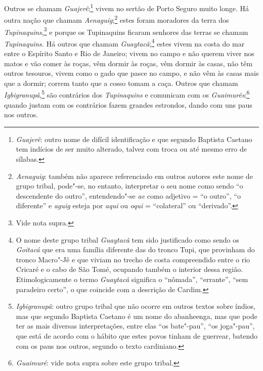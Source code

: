  Outros se chamam \textit{Guajerê};\footnote{ \textit{Guajerê}: outro
nome de difícil identificação e que segundo Baptista Caetano tem
indícios de ser muito alterado, talvez com troca ou até mesmo erro de
sílabas.} vivem no sertão de Porto Seguro muito longe. Há
outra nação que chamam \textit{Aenaguig};\footnote{ \textit{Aenaguig}: 
também não aparece referenciado em outros autores este nome de grupo
tribal, pode"-se, no entanto, interpretar o seu nome como sendo ``o
descendente do outro'', entendendo"-se \textit{ae} como adjetivo = ``o
outro'', ``o diferente'' e \textit{aguig} esteja por \textit{aqui} ou
\textit{oqui} = ``colateral'' ou ``derivado''.} estes foram
moradores da terra dos \textit{Tupinaquins},\footnote{ Vide nota
supra.} e porque os Tupinaquins ficaram senhores das terras se
chamam \textit{Tupinaquins.} Há outros que chamam 
\textit{Guaytacâ};\footnote{ O nome deste grupo tribal \textit{Guaytacâ} tem sido
justificado como sendo os \textit{Goitacá} que era uma família
diferente das do tronco Tupi, que provinham do tronco Macro"-Jê e que
viviam no trecho de costa compreendido entre o rio Cricaré e o cabo de
São Tomé, ocupando também o interior dessa região. Etimologicamente o
termo \textit{Guaytacâ} significa o ``nômada'', ``errante'', ``sem paradeiro
certo'', o que coincide com a descrição de Cardim.} estes vivem
na costa do mar entre o Espírito Santo e Rio de Janeiro; vivem no campo
e não querem viver nos matos e vão comer às roças, vêm dormir às roças,
vêm dormir às casas, não têm outros tesouros, vivem como o gado que
pasce no campo, e não vêm às casas mais que a dormir; correm tanto que
a cosso tomam a caça. Outros que chamam 
\textit{Igbigranupâ},\footnote{ \textit{Igbigranupâ}: 
outro grupo tribal que não ocorre em outros
textos sobre índios, mas que segundo Baptista Caetano é um nome do
abanheenga, mas que pode ter as mais diversas interpretações, entre
elas ``os bate"-pau'', ``os joga"-pau'', que está de acordo com o hábito que
estes povos tinham de guerrear, batendo com os paus nos outros, segundo
o texto cardiniano.} são contrários dos \textit{Tupinaquins} e
comunicam com os \textit{Guaimurês};\footnote{ \textit{Guaimuré}: vide
nota supra sobre este grupo tribal.}  quando justam com os
contrários fazem grandes estrondos, dando com uns paus nos outros.

